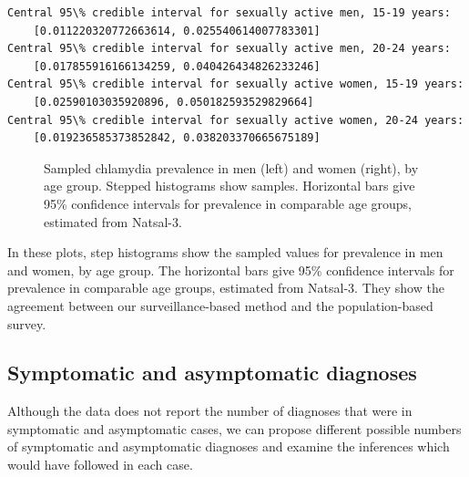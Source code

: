 \documentclass{article}
\begin{document}
    \begin{Verbatim}[commandchars=\\\{\}]
Central 95\% credible interval for sexually active men, 15-19 years: 
 	[0.011220320772663614, 0.025540614007783301]
Central 95\% credible interval for sexually active men, 20-24 years: 
 	[0.017855916166134259, 0.040426434826233246]
Central 95\% credible interval for sexually active women, 15-19 years: 
 	[0.02590103035920896, 0.050182593529829664]
Central 95\% credible interval for sexually active women, 20-24 years: 
 	[0.019236585373852842, 0.038203370665675189]
    \end{Verbatim}

    \begin{figure}
        \begin{center}\end{center}
        \caption{Sampled chlamydia prevalence in men (left) and women (right), by age group. Stepped histograms show samples. Horizontal bars give 95\% confidence intervals for prevalence in comparable age groups, estimated from Natsal-3.}
        \label{fig:prev_samples_byage}
    \end{figure}
    
    In these plots, step histograms show the sampled values for prevalence
in men and women, by age group. The horizontal bars give 95\% confidence
intervals for prevalence in comparable age groups, estimated from
Natsal-3. They show the agreement between our surveillance-based method
and the population-based survey.

    \subsection{Symptomatic and asymptomatic
diagnoses}\label{symptomatic-and-asymptomatic-diagnoses}

Although the data does not report the number of diagnoses that were in
symptomatic and asymptomatic cases, we can propose different possible
numbers of symptomatic and asymptomatic diagnoses and examine the
inferences which would have followed in each case.
\end{document}
